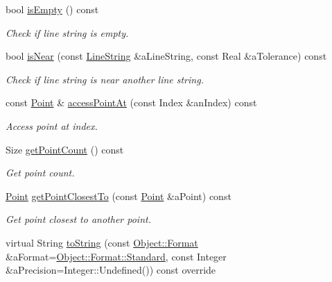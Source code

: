 \begin{DoxyCompactItemize}
bool \hyperlink{classostk_1_1math_1_1geom_1_1d2_1_1objects_1_1_line_string_a2fe1d6a0a8a917b00b13ab9c3cf24bf3}{is\+Empty} () const
\begin{DoxyCompactList}\small\item\em Check if line string is empty. \end{DoxyCompactList}\item 
bool \hyperlink{classostk_1_1math_1_1geom_1_1d2_1_1objects_1_1_line_string_a5772e2ac0f24c76d9957e1617077b04a}{is\+Near} (const \hyperlink{classostk_1_1math_1_1geom_1_1d2_1_1objects_1_1_line_string}{Line\+String} \&a\+Line\+String, const Real \&a\+Tolerance) const
\begin{DoxyCompactList}\small\item\em Check if line string is near another line string. \end{DoxyCompactList}\item 
const \hyperlink{classostk_1_1math_1_1geom_1_1d2_1_1objects_1_1_point}{Point} \& \hyperlink{classostk_1_1math_1_1geom_1_1d2_1_1objects_1_1_line_string_a716b6b5f34bbbdcea2a3b4e8e5faf9b5}{access\+Point\+At} (const Index \&an\+Index) const
\begin{DoxyCompactList}\small\item\em Access point at index. \end{DoxyCompactList}\item 
Size \hyperlink{classostk_1_1math_1_1geom_1_1d2_1_1objects_1_1_line_string_af4a7c10fc43a4facff65280e23217ec4}{get\+Point\+Count} () const
\begin{DoxyCompactList}\small\item\em Get point count. \end{DoxyCompactList}\item 
\hyperlink{classostk_1_1math_1_1geom_1_1d2_1_1objects_1_1_point}{Point} \hyperlink{classostk_1_1math_1_1geom_1_1d2_1_1objects_1_1_line_string_adba8e8498cade7e10b4df301b0215d8e}{get\+Point\+Closest\+To} (const \hyperlink{classostk_1_1math_1_1geom_1_1d2_1_1objects_1_1_point}{Point} \&a\+Point) const
\begin{DoxyCompactList}\small\item\em Get point closest to another point. \end{DoxyCompactList}\item 
virtual String \hyperlink{classostk_1_1math_1_1geom_1_1d2_1_1objects_1_1_line_string_a5312030bced48de68f8902bb6581461d}{to\+String} (const \hyperlink{classostk_1_1math_1_1geom_1_1d2_1_1_object_aa76f9e30caebf4005bafbdff447f66cf}{Object\+::\+Format} \&a\+Format=\hyperlink{classostk_1_1math_1_1geom_1_1d2_1_1_object_aa76f9e30caebf4005bafbdff447f66cfaeb6d8ae6f20283755b339c0dc273988b}{Object\+::\+Format\+::\+Standard}, const Integer \&a\+Precision=Integer\+::\+Undefined()) const override

\end{DoxyCompactItemize}
